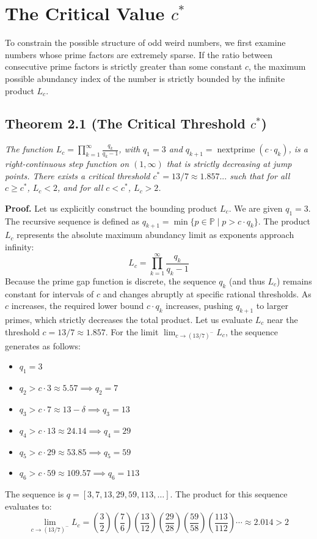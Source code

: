 \documentclass{erdos_paper}
\begin{document}
\section{The Critical Value $c^{\ast}$}

To constrain the possible structure of odd weird numbers, we first examine numbers whose prime factors are extremely sparse. If the ratio between consecutive prime factors is strictly greater than some constant $c$, the maximum possible abundancy index of the number is strictly bounded by the infinite product $L_c$.

\subsection{Theorem 2.1 (The Critical Threshold $c^{\ast}$)}

\textit{The function $L_c = \prod_{k=1}^\infty \frac{q_k}{q_k-1}$, with $q_1 = 3$ and $q_{k+1} = \operatorname{nextprime}(c \cdot q_k)$, is a right-continuous step function on $(1, \infty)$ that is strictly decreasing at jump points. There exists a critical threshold $c^{\ast} = 13/7 \approx 1.857...$ such that for all $c \ge c^{\ast}$, $L_c < 2$, and for all $c < c^{\ast}$, $L_c > 2$.}

\textbf{Proof.} Let us explicitly construct the bounding product $L_c$. We are given $q_1 = 3$. 
The recursive sequence is defined as $q_{k+1} = \min \{ p \in \mathbb{P} \mid p > c \cdot q_k \}$. 
The product $L_c$ represents the absolute maximum abundancy limit as exponents approach infinity:
$$ L_c = \prod_{k=1}^{\infty} \frac{q_k}{q_k - 1} $$
Because the prime gap function is discrete, the sequence $q_k$ (and thus $L_c$) remains constant for intervals of $c$ and changes abruptly at specific rational thresholds. As $c$ increases, the required lower bound $c \cdot q_k$ increases, pushing $q_{k+1}$ to larger primes, which strictly decreases the total product. Let us evaluate $L_c$ near the threshold $c = 13/7 \approx 1.857$.
For the limit $\lim_{c \to (13/7)^{-}} L_c$, the sequence generates as follows:
\begin{itemize}
    \item $q_1 = 3$
    \item $q_2 > c \cdot 3 \approx 5.57 \implies q_2 = 7$
    \item $q_3 > c \cdot 7 \approx 13 - \delta \implies q_3 = 13$
    \item $q_4 > c \cdot 13 \approx 24.14 \implies q_4 = 29$
    \item $q_5 > c \cdot 29 \approx 53.85 \implies q_5 = 59$
    \item $q_6 > c \cdot 59 \approx 109.57 \implies q_6 = 113$
\end{itemize}
The sequence is $q = [3, 7, 13, 29, 59, 113, \dots]$.
The product for this sequence evaluates to:
$$ \lim_{c \to (13/7)^{-}} L_c = \left(\frac{3}{2}\right) \left(\frac{7}{6}\right) \left(\frac{13}{12}\right) \left(\frac{29}{28}\right) \left(\frac{59}{58}\right) \left(\frac{113}{112}\right) \cdots \approx 2.014 > 2 $$
\end{document}
